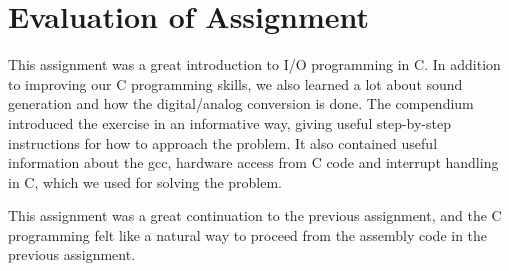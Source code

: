 \section{Evaluation of Assignment}

This assignment was a great introduction to I/O programming in C. In addition to improving our C programming skills, we also learned a lot about sound generation and how the digital/analog conversion is done. The compendium \cite{eeds-compendium} introduced the exercise in an informative way, giving useful step-by-step instructions for how to approach the problem. It also contained useful information about the gcc, hardware access from C code and interrupt handling in C, which we used for solving the problem.

This assignment was a great continuation to the previous assignment, and the C programming felt like a natural way to proceed from the assembly code in the previous assignment.
